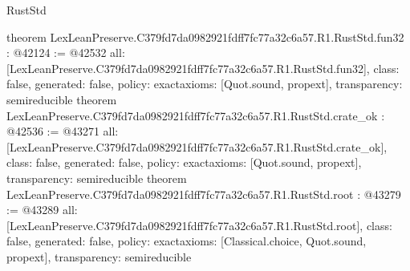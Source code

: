 \begin{lexlean}{RustStd}
\begin{coremodule}
{}
theorem LexLeanPreserve.C379fd7da0982921fdff7fc77a32c6a57.R1.RustStd.fun32 : @42124 := @42532 {
  all: [LexLeanPreserve.C379fd7da0982921fdff7fc77a32c6a57.R1.RustStd.fun32],
  class: false,
  generated: false,
  policy: exact{axioms: [Quot.sound, propext]},
  transparency: semireducible
}
theorem LexLeanPreserve.C379fd7da0982921fdff7fc77a32c6a57.R1.RustStd.crate_ok : @42536 := @43271 {
  all: [LexLeanPreserve.C379fd7da0982921fdff7fc77a32c6a57.R1.RustStd.crate_ok],
  class: false,
  generated: false,
  policy: exact{axioms: [Quot.sound, propext]},
  transparency: semireducible
}
theorem LexLeanPreserve.C379fd7da0982921fdff7fc77a32c6a57.R1.RustStd.root : @43279 := @43289 {
  all: [LexLeanPreserve.C379fd7da0982921fdff7fc77a32c6a57.R1.RustStd.root],
  class: false,
  generated: false,
  policy: exact{axioms: [Classical.choice, Quot.sound, propext]},
  transparency: semireducible
}


\end{coremodule}
\end{lexlean}

